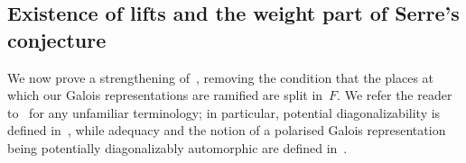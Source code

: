 \documentclass{amsart}
\theoremstyle{definition}
\theoremstyle{remark}
\newcommand{\mar}[1]{}
\newcommand{\mar}[1]{\marginpar{\raggedright\tiny squirrel #1}}
\begin{document}
\subsection{Existence of lifts and the weight part of Serre's conjecture}\label{subsec: existence of
  lifts}%
We now prove a strengthening
of~\cite[Thm.\ A.4.1]{MR3072811}, removing the condition that the
places at which our Galois representations are ramified are split
in~$F$. We refer the reader to~\cite{BLGGT} for any unfamiliar
terminology; in particular, potential diagonalizability is defined
in~\cite[\S 1.4]{BLGGT}, while adequacy and the notion of a polarised
Galois representation being potentially diagonalizably automorphic are
defined in~\cite[\S 2.1]{BLGGT}. %
\end{document}
